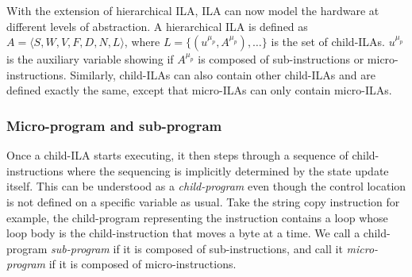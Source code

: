 \iffalse
Summarizing the above definition, a child-ILA is defined as follow:
\begin{eqnarray}
  A^\mu &=& \langle S^\mu, V^\mu, F^\mu, D^\mu, N^\mu \rangle 
        \text{, where} \nonumber \\
    &S^\mu& \text{ is the vector of state variables, } \nonumber \\
    &V^\mu& : S^\mu \mapsto \bd \text{ is the valid function, } \nonumber \\
    &F^\mu& : S^\mu \mapsto bvec_l \text{ is the fetch function, } \nonumber \\
    &D^\mu& = \{ \delta_j^\mu : bvec_l \mapsto \bd \}
            \text{ is the decode function, and} \nonumber \\
    &N^\mu& = \{ N_j^\mu : S^\mu \mapsto S^\mu \}
            \text{ is the next state function.} \nonumber
\end{eqnarray}
\fi

With the extension of hierarchical ILA, ILA can now model the hardware at 
different levels of abstraction.
%
A hierarchical ILA is defined as
$A = \langle S, W, V, F, D, N, L \rangle$, where 
$L = \{ (u^{\mu_p}, A^{\mu_p}), \dots \}$ is the set of child-ILAs.
$u^{\mu_p}$ is the auxiliary variable showing if $A^{\mu_p}$ is composed of 
sub-instructions or micro-instructions.
%
Similarly, child-ILAs can also contain other child-ILAs and are defined exactly 
the same, except that micro-ILAs can only contain micro-ILAs.

\subsubsection*{Micro-program and sub-program}
Once a child-ILA starts executing, it then steps through a sequence of 
child-instructions where the sequencing is implicitly determined by the state
update itself.
This can be understood as a \textit{child-program} even though the control 
location is not defined on a specific variable as usual.
%
Take the string copy instruction for example, the child-program representing 
the instruction contains a loop whose loop body is the child-instruction that 
moves a byte at a time.
% 
We call a child-program \textit{sub-program} if it is composed of 
sub-instructions, and call it \textit{micro-program} if it is composed of 
micro-instructions. 

